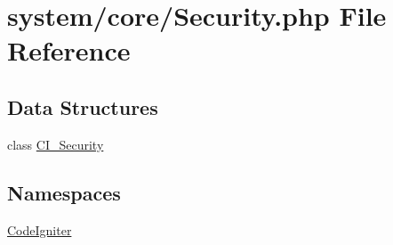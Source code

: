 \hypertarget{_security_8php}{\section{system/core/\-Security.php File Reference}
\label{_security_8php}
}
\subsection*{Data Structures}
\begin{DoxyCompactItemize}
\item 
class \hyperlink{class_c_i___security}{C\-I\-\_\-\-Security}
\end{DoxyCompactItemize}
\subsection*{Namespaces}
\begin{DoxyCompactItemize}
\item 
\hyperlink{namespace_code_igniter}{Code\-Igniter}
\end{DoxyCompactItemize}
